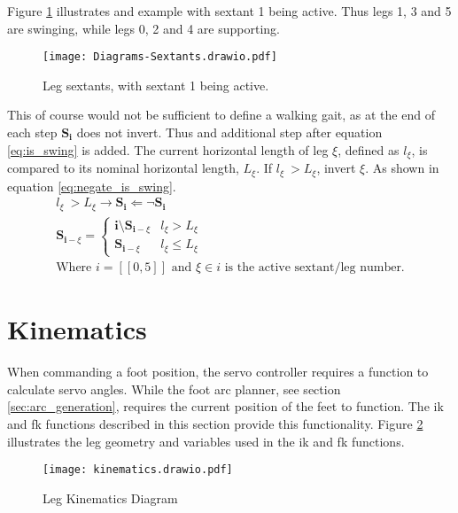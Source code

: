     \noindent
    Figure \ref{fig:sextants} illustrates and example with sextant 1 being active. Thus legs 1, 3 and 5 are swinging, while legs 0, 2 and 4 are supporting.
    \begin{figure}[h]
        \centering
        \hspace{1.1cm}
        \texttt{[image: Diagrams-Sextants.drawio.pdf]}
        \caption{Leg sextants, with sextant 1 being active.} 
        \label{fig:sextants}
    \end{figure}
    
    \noindent
    This of course would not be sufficient to define a walking gait, as at the end of each step \(\boldsymbol{S_i}\) does not invert.
    Thus and additional step after equation \ref{eq:is_swing} is added. The current horizontal length of leg \(\xi\), defined as \(l_\xi\), is compared to its nominal
    horizontal length, \(L_\xi\). If \(l_\xi\ > L_\xi\), invert \(\xi\). As shown in equation \ref{eq:negate_is_swing}.
    \begin{equation} \label{eq:negate_is_swing}
        \begin{gathered}
            l_\xi\ > L_\xi \longrightarrow \boldsymbol{S_i} \Longleftarrow  \lnot \boldsymbol{S_i} \\
            \boldsymbol{S}_{\boldsymbol{i} - \xi} =
                                                \begin{cases}
                                                    \boldsymbol{i} \setminus \boldsymbol{S}_{\boldsymbol{i} - \xi} & l_\xi > L_\xi \\
                                                    \boldsymbol{S}_{\boldsymbol{i} - \xi} & l_\xi \leq L_\xi
                                                \end{cases}\\[0.1cm]
            \text{Where \(i = [\![0,5]\!]\) and \(\xi \in i\) is the active sextant/leg number.}
        \end{gathered}
    \end{equation}

\newpage
\section{Kinematics}
    When commanding a foot position, the servo controller requires a function to calculate servo angles. While the foot arc planner, see section 
    \ref{sec:arc_generation}, requires the current position of the feet to function. The \ac{ik} and \ac{fk} functions described in this section provide
    this functionality. Figure \ref{fig:kinematics} illustrates the leg geometry and variables used in the \ac{ik} and \ac{fk} functions.
    \begin{figure}[h]
        \centering
        \texttt{[image: kinematics.drawio.pdf]}
        \caption{Leg Kinematics Diagram}
        \label{fig:kinematics}
    \end{figure}

